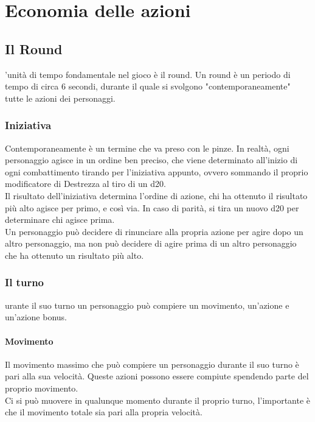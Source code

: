 \chapter{Economia delle azioni}
\section{Il Round}
'unità di tempo fondamentale nel gioco è il round. Un round è un periodo di tempo di circa 6 secondi, durante il quale si svolgono "contemporaneamente" tutte le azioni dei personaggi.\\

\subsection{Iniziativa}
Contemporaneamente è un termine che va preso con le pinze. In realtà, ogni personaggio agisce in un ordine ben preciso, che viene determinato all'inizio di ogni combattimento tirando per l'iniziativa appunto, ovvero sommando il proprio modificatore di Destrezza al tiro di un d20. \\ Il risultato dell'iniziativa determina l'ordine di azione, chi ha ottenuto il risultato più alto agisce per primo, e così via. In caso di parità, si tira un nuovo d20 per determinare chi agisce prima.\\ Un personaggio può decidere di rinunciare alla propria azione per agire dopo un altro personaggio, ma non può decidere di agire prima di un altro personaggio che ha ottenuto un risultato più alto.\\ 

\subsection{Il turno}
urante il suo turno un personaggio può compiere un movimento, un'azione e un'azione bonus.\\

\subsubsection{Movimento}
Il movimento massimo che può compiere un personaggio durante il suo turno è pari alla sua velocità. Queste azioni possono essere compiute spendendo parte del proprio movimento.\\ Ci si può muovere in qualunque momento durante il proprio turno, l'importante è che il movimento totale sia pari alla propria velocità.\\
